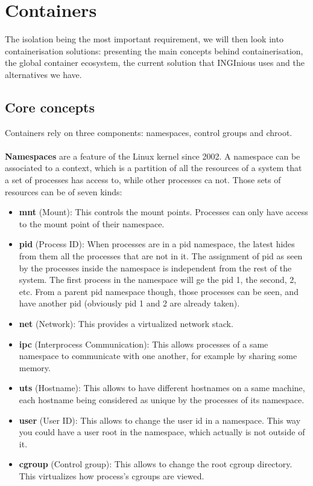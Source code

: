 \section{Containers}
The isolation being the most important requirement, we will then look into containerisation solutions: presenting the main concepts behind containerisation, the global container ecosystem, the current solution that INGInious uses and the alternatives we have.

\subsection{Core concepts}
Containers rely on three components: namespaces, control groups and chroot.
\paragraph{}\textbf{Namespaces} are a feature of the Linux kernel since 2002.  A namespace can be associated to a context, which is a partition of all the resources of a system that a set of processes has access to, while other processes ca not.  Those sets of resources can be of seven kinds:
\begin{itemize}
\renewcommand\labelitemi{--}
  \item \textbf{mnt} (Mount): This controls the mount points.  Processes can only have access to the mount point of their namespace.
  \item \textbf{pid} (Process ID): When processes are in a pid namespace, the latest hides from them all the processes that are not in it.  The assignment of pid as seen by the processes inside the namespace is independent from the rest of the system.  The first process in the namespace will ge the pid 1, the second, 2, etc.  From a parent pid namespace though, those processes can be seen, and have another pid (obviously pid 1 and 2 are already taken).
  \item \textbf{net} (Network): This provides a virtualized network stack.
  \item \textbf{ipc} (Interprocess Communication): This allows processes of a same namespace to communicate with one another, for example by sharing some memory.
  \item \textbf{uts} (Hostname): This allows to have different hostnames on a same machine, each hostname being considered as unique by the processes of its namespace.
  \item \textbf{user} (User ID): This allows to change the user id in a namespace.  This way you could have a user root in the namespace, which actually is not outside of it.
  \item \textbf{cgroup} (Control group): This allows to change the root cgroup directory. This virtualizes how process's cgroups are viewed.
\end{itemize}

